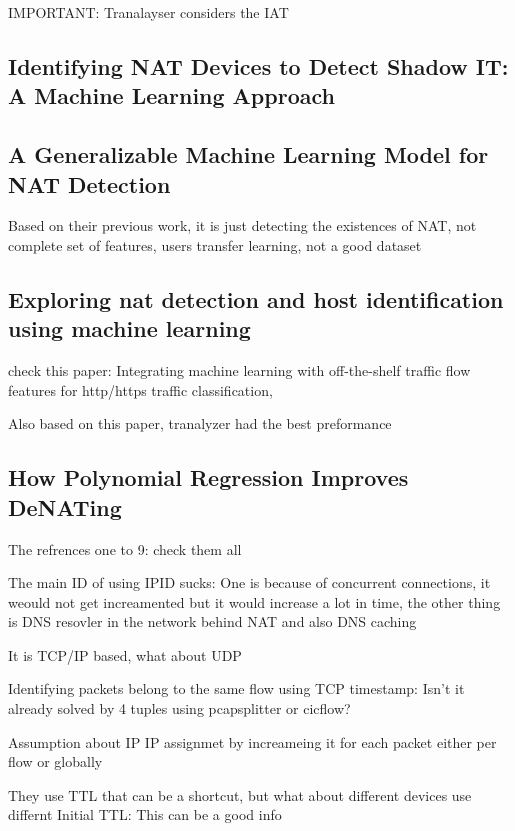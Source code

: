 IMPORTANT: Tranalayser considers the IAT 

\subsection{Identifying NAT Devices to Detect Shadow IT: A Machine Learning Approach \cite{nassar2021identifying}}




\subsection{A Generalizable Machine Learning Model for NAT
Detection \cite{nassar2023generalizable}}
Based on their previous work, it is just detecting the existences of NAT, not complete set of features, users transfer learning, not a good dataset 



\subsection{Exploring nat detection and host identification using machine learning \cite{khatouni2019exploring}}

check this paper: Integrating machine learning
with off-the-shelf traffic flow features for http/https traffic classification,

Also based on this paper, tranalyzer had the best preformance 


\subsection{How Polynomial Regression Improves DeNATing \cite{adler2023polynomial}}
The refrences one to 9: check them all

The main ID of using IPID sucks: One is because of concurrent connections, it weould not get increamented but it would increase a lot in time, the other thing is DNS resovler in the network behind NAT and also DNS caching 

It is TCP/IP based, what about UDP 

Identifying packets belong to the same flow using TCP timestamp: Isn't it already solved by 4 tuples using pcapsplitter or cicflow?


Assumption about IP IP assignmet by increameing it for each packet either per flow or globally

They use TTL that can be a shortcut, but what about different devices use differnt Initial TTL: This can be a good info 

